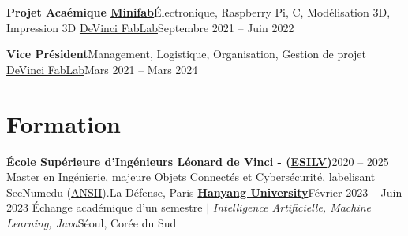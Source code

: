 \documentclass[letterpaper,11pt]{article}
\begin{document}
    \resumeSubheading
      {\textbf{Projet Acaémique \href{https://www.instagram.com/tv/CXvp14Ol7Vu/}{\underline{Minifab}}}}{Électronique, Raspberry Pi, C, Modélisation 3D, Impression 3D}
      {\href{https://www.linkedin.com/company/devinci-fablab/}{DeVinci FabLab}}{Septembre 2021 -- Juin 2022}
      \resumeItemListStart
      \resumeItemListEnd

    \resumeSubheading
      {\textbf{Vice Président}}{Management, Logistique, Organisation, Gestion de projet}
      {\href{https://www.linkedin.com/company/devinci-fablab/}{DeVinci FabLab}}{Mars 2021 -- Mars 2024}
      \resumeItemListStart
      \resumeItemListEnd
  \resumeSubHeadingListEnd

\section{Formation}
  \resumeSubHeadingListStart
    \resumeSubheading
      {\textbf{École Supérieure d'Ingénieurs Léonard de Vinci - (\href{https://www.esilv.fr/}{\underline{ESILV}})}}{2020 -- 2025}
      {Master en Ingénierie, majeure Objets Connectés et Cybersécurité, labelisant SecNumedu (\href{https://cyber.gouv.fr/actualites/secnumedu-le-nouveau-label-des-formations-superieures-en-securite-du-numerique}{ANSII}).}{La Défense, Paris}
    \resumeSubheading
      {\href{https://www.hanyang.ac.kr/web/eng/home}{\textbf{Hanyang University}}}{Février 2023 -- Juin 2023}
      {Échange académique d’un semestre $|$ \emph{Intelligence Artificielle, Machine Learning, Java}}{Séoul, Corée du Sud}
  \resumeSubHeadingListEnd
\end{document}
